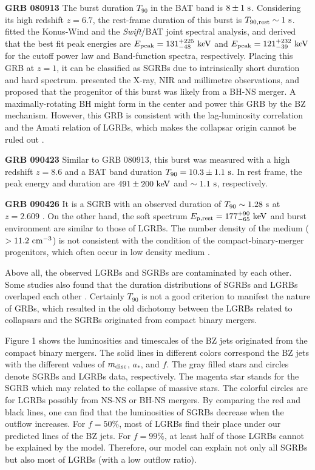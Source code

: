 \documentclass[a4paper,fleqn,usenatbib]{mnras}
\begin{document}
\textbf{GRB 080913} The burst duration $T_{90}$ in the BAT band is $8\pm1\rm~s$. Considering its high redshift $z=6.7$, the rest-frame duration of this burst is $T_{90, \rm rest}\sim1 \rm~s$. \citet{Palshin2008} fitted the Konus-Wind and the \textit{Swift}/BAT joint spectral analysis, and derived that the best fit peak energies are $E_{\rm peak}=131_{-48}^{+225} \rm~keV$ and $E_{\rm peak}=121_{-39}^{+232} \rm~keV$ for the cutoff power law and Band-function spectra, respectively. Placing this GRB at $z=1$, it can be classified as SGRBs due to intrinsically short duration and hard spectrum. \citet{PerezRamirez2010} presented the X-ray, NIR and millimetre observations, and proposed that the progenitor of this burst was likely from a BH-NS merger. A maximally-rotating BH might form in the center and power this GRB by the BZ mechanism. However, this GRB is consistent with the lag-luminosity correlation and the Amati relation of LGRBs, which makes the collapsar origin cannot be ruled out \citep[]{Greiner2009,Zhang2009}.

\textbf{GRB 090423} Similar to GRB 080913, this burst was measured with a high redshift $z=8.6$ and a BAT band duration $T_{90}=10.3\pm1.1 \rm~s$. In rest frame, the peak energy and duration are $491\pm200 \rm~keV$ \citep{Amati2009} and $\sim1.1 \rm~s$, respectively.

\textbf{GRB 090426} It is a SGRB with an observed duration of $T_{90}\sim1.28 \rm~s$ at $z=2.609$ \citep{Antonelli2009}. On the other hand, the soft spectrum $E_{\rm p, rest}=177_{-65}^{+90} \rm~keV$ \citep{Amati2009} and  burst environment are similar to those of LGRBs. The number density of the medium ($>11.2 \rm~cm^{-3}$) is not consistent with the condition of the compact-binary-merger progenitors, which often occur in low density medium \citep[e.g.,][]{Xin2011}.

Above all, the observed LGRBs and SGRBs are contaminated by each other. Some studies also found that the duration distributions of SGRBs and LGRBs overlaped each other \citep[e.g.,][]{Horvath2002}. Certainly $T_{90}$ is not a good criterion to manifest the nature of GRBs, which resulted in the old dichotomy between the LGRBs related to collapsars and the SGRBs originated from compact binary mergers.

Figure 1 shows the luminosities and timescales of the BZ jets originated from the compact binary mergers. The solid lines in different colors correspond the BZ jets with the different values of $m_{\rm disc}$, $a_{*}$, and $f$. The gray filled stars and circles denote SGRBs and LGRBs data, respectively. The magenta star stands for the SGRB which may related to the collapse of massive stars. The colorful circles are for LGRBs possibly from NS-NS or BH-NS mergers. By comparing the red and black lines, one can find that the luminosities of SGRBs decrease when the outflow increases. For $f = 50\%$, most of LGRBs find their place under our predicted lines of the BZ jets. For $f = 99\%$, at least half of those LGRBs cannot be explained by the model. Therefore, our model can explain not only all SGRBs but also most of LGRBs (with a low outflow ratio).
\end{document}
